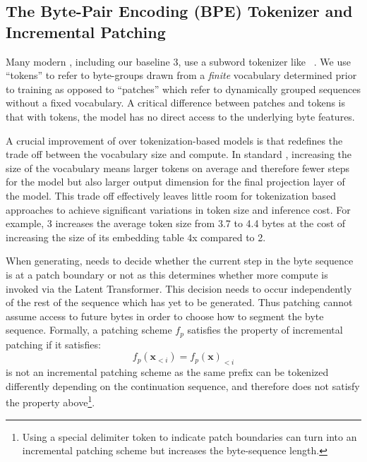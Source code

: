 \documentclass[]{fairmeta}
\begin{document}
\subsection{The Byte-Pair Encoding (BPE) Tokenizer and Incremental Patching}
\label{section:incremental-patching}
\label{section:bpe-patch}

Many modern \llms{}, including our baseline \llama{} 3, use a subword tokenizer like \bpe{}~\citep{gage1994new, sennrich-etal-2016-neural}. 
We use ``tokens'' to refer to byte-groups drawn from a \textit{finite} vocabulary determined prior to training as opposed to ``patches'' which refer to dynamically grouped sequences without a fixed vocabulary. 
A critical difference between patches and tokens is that with tokens, the model has no direct access to the underlying byte features. 

A crucial improvement of \model{} over tokenization-based models is that redefines the trade off between the vocabulary size and compute. In standard \llms{}, increasing the size of the vocabulary means larger tokens on average and therefore fewer steps for the model but also larger output dimension for the final projection layer of the model. This trade off effectively leaves little room for tokenization based approaches to achieve significant variations in token size and inference cost. For example, \llama{} 3 increases the average token size from  3.7 to 4.4 bytes at the cost of increasing the size of its embedding table 4x compared to \llama{} 2.

When generating, \model{} needs to decide whether the current step in the byte sequence is at a patch boundary or not as this determines whether more compute is invoked via the Latent Transformer. This decision needs to occur independently of the rest of the sequence which has yet to be generated. Thus patching cannot assume access to future bytes in order to choose how to segment the byte sequence. Formally, a patching scheme $f_p$ satisfies the property of incremental patching if it satisfies:
$$f_p(\pmb{x}_{<i}) = f_p(\pmb{x})_{<i}$$
\bpe{} is not an incremental patching scheme as the same prefix can be tokenized differently depending on the continuation sequence, and therefore does not satisfy the property above\footnote{Using a special delimiter token to indicate patch boundaries can turn \bpe{} into an incremental patching scheme but increases the byte-sequence length.}. 
\end{document}
